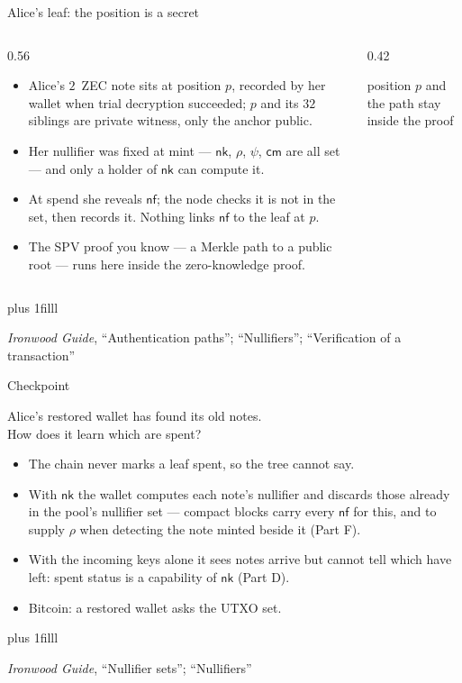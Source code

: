 \documentclass[aspectratio=169,11pt]{beamer}
\newcommand{\nfsym}{\ensuremath{\mathsf{nf}}}
\newcommand{\cmsym}{\ensuremath{\mathsf{cm}}}
\newcommand{\nksym}{\ensuremath{\mathsf{nk}}}
\newcommand{\src}[1]{\par\vskip0pt plus 1filll
  {\fontsize{6}{7.2}\selectfont\color{arbdim}\raggedright #1\par}}
\begin{document}
\begin{frame}{Alice's leaf: the position is a secret}
\begin{columns}[c]
\begin{column}{0.56\textwidth}
\begin{itemize}\setlength{\itemsep}{2pt}
  \item Alice's $2$~ZEC note sits at position $p$, recorded by her
    wallet when trial decryption succeeded; $p$ and its $32$ siblings
    are private witness, only the anchor public.
  \item Her nullifier was fixed at mint --- $\nksym$, $\rho$, $\psi$,
    $\cmsym$ are all set --- and only a holder of $\nksym$ can compute
    it.
  \item At spend she reveals $\nfsym$; the node checks it is not in
    the set, then records it. Nothing links $\nfsym$ to the leaf at
    $p$.
  \item The SPV proof you know --- a Merkle path to a public root ---
    runs here inside the zero-knowledge proof.
\end{itemize}
\end{column}
\begin{column}{0.42\textwidth}
\centering
\TreeFig[leaf]
\par\smallskip
{\scriptsize position $p$ and the path stay inside the proof}
\end{column}
\end{columns}
\src{\emph{Ironwood Guide}, ``Authentication paths''; ``Nullifiers'';
  ``Verification of a transaction''}
\end{frame}

\begin{frame}{Checkpoint}
\begin{center}
\Large Alice's restored wallet has found its old notes.\\
How does it learn which are spent?
\end{center}
\pause
\bigskip
\begin{itemize}
  \item The chain never marks a leaf spent, so the tree cannot say.
  \item With $\nksym$ the wallet computes each note's nullifier and
    discards those already in the pool's nullifier set --- compact
    blocks carry every $\nfsym$ for this, and to supply $\rho$ when
    detecting the note minted beside it (Part F).
  \item With the incoming keys alone it sees notes arrive but cannot
    tell which have left: spent status is a capability of $\nksym$
    (Part D).
  \item Bitcoin: a restored wallet asks the UTXO set.
\end{itemize}
\src{\emph{Ironwood Guide}, ``Nullifier sets''; ``Nullifiers''}
\end{frame}
\end{document}
